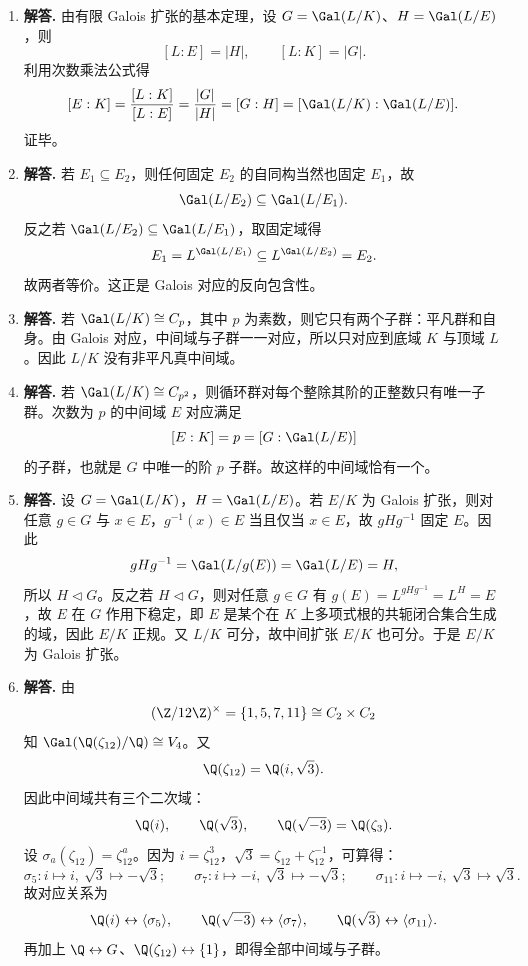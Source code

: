 \begin{enumerate}[label=\textbf{\arabic*.}, leftmargin=*, itemsep=1em]
\item \textbf{解答.} 由有限 Galois 扩张的基本定理，设 $G=\Gal(L/K)$、$H=\Gal(L/E)$，则
\[
[L:E]=|H|,
\qquad [L:K]=|G|.
\]
利用次数乘法公式得
\[
[E:K]=\frac{[L:K]}{[L:E]}=\frac{|G|}{|H|}=[G:H]=[\Gal(L/K):\Gal(L/E)].
\]
证毕。

\item \textbf{解答.} 若 $E_1\subseteq E_2$，则任何固定 $E_2$ 的自同构当然也固定 $E_1$，故
\[
\Gal(L/E_2)\subseteq \Gal(L/E_1).
\]
反之若 $\Gal(L/E_2)\subseteq\Gal(L/E_1)$，取固定域得
\[
E_1=L^{\Gal(L/E_1)}\subseteq L^{\Gal(L/E_2)}=E_2.
\]
故两者等价。这正是 Galois 对应的反向包含性。

\item \textbf{解答.} 若 $\Gal(L/K)\cong C_p$，其中 $p$ 为素数，则它只有两个子群：平凡群和自身。由 Galois 对应，中间域与子群一一对应，所以只对应到底域 $K$ 与顶域 $L$。因此 $L/K$ 没有非平凡真中间域。

\item \textbf{解答.} 若 $\Gal(L/K)\cong C_{p^2}$，则循环群对每个整除其阶的正整数只有唯一子群。次数为 $p$ 的中间域 $E$ 对应满足
\[
[E:K]=p=[G:\Gal(L/E)]
\]
的子群，也就是 $G$ 中唯一的阶 $p$ 子群。故这样的中间域恰有一个。

\item \textbf{解答.} 设 $G=\Gal(L/K)$，$H=\Gal(L/E)$。若 $E/K$ 为 Galois 扩张，则对任意 $g\in G$ 与 $x\in E$，$g^{-1}(x)\in E$ 当且仅当 $x\in E$，故 $gHg^{-1}$ 固定 $E$。因此
\[
gHg^{-1}=\Gal(L/g(E))=\Gal(L/E)=H,
\]
所以 $H\lhd G$。反之若 $H\lhd G$，则对任意 $g\in G$ 有 $g(E)=L^{gHg^{-1}}=L^H=E$，故 $E$ 在 $G$ 作用下稳定，即 $E$ 是某个在 $K$ 上多项式根的共轭闭合集合生成的域，因此 $E/K$ 正规。又 $L/K$ 可分，故中间扩张 $E/K$ 也可分。于是 $E/K$ 为 Galois 扩张。

\item \textbf{解答.} 由
\[
(\Z/12\Z)^\times=\{1,5,7,11\}\cong C_2\times C_2
\]
知 $\Gal(\Q(\zeta_{12})/\Q)\cong V_4$。又
\[
\Q(\zeta_{12})=\Q(i,\sqrt3).
\]
因此中间域共有三个二次域：
\[
\Q(i),\qquad \Q(\sqrt3),\qquad \Q(\sqrt{-3})=\Q(\zeta_3).
\]
设 $\sigma_a(\zeta_{12})=\zeta_{12}^a$。因为 $i=\zeta_{12}^3$，$\sqrt3=\zeta_{12}+\zeta_{12}^{-1}$，可算得：
\[
\sigma_5: i\mapsto i,\ \sqrt3\mapsto-\sqrt3;
\qquad
\sigma_7: i\mapsto-i,\ \sqrt3\mapsto-\sqrt3;
\qquad
\sigma_{11}: i\mapsto-i,\ \sqrt3\mapsto\sqrt3.
\]
故对应关系为
\[
\Q(i)\leftrightarrow \langle\sigma_5\rangle,
\qquad
\Q(\sqrt{-3})\leftrightarrow \langle\sigma_7\rangle,
\qquad
\Q(\sqrt3)\leftrightarrow \langle\sigma_{11}\rangle.
\]
再加上 $\Q\leftrightarrow G$、$\Q(\zeta_{12})\leftrightarrow\{1\}$，即得全部中间域与子群。


\end{enumerate}
